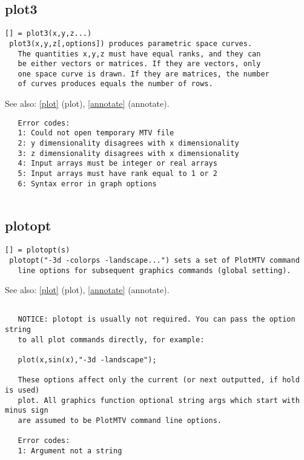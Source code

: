 \documentclass[a4paper]{article}
\begin{document}
\subsection{plot3\label{plot3}}

\begin{tscreen}
\begin{verbatim}
[] = plot3(x,y,z...)
 plot3(x,y,z[,options]) produces parametric space curves.
   The quantities x,y,z must have equal ranks, and they can
   be either vectors or matrices. If they are vectors, only
   one space curve is drawn. If they are matrices, the number
   of curves produces equals the number of rows.
\end{verbatim}

See also: \ref{plot} {(plot)}, \ref{annotate} {(annotate)}.
\begin{verbatim}
   Error codes:
   1: Could not open temporary MTV file
   2: y dimensionality disagrees with x dimensionality
   3: z dimensionality disagrees with x dimensionality
   4: Input arrays must be integer or real arrays
   5: Input arrays must have rank equal to 1 or 2
   6: Syntax error in graph options
   
\end{verbatim}
\end{tscreen}





\subsection{plotopt\label{plotopt}}

\begin{tscreen}
\begin{verbatim}
[] = plotopt(s)
 plotopt("-3d -colorps -landscape...") sets a set of PlotMTV command
   line options for subsequent graphics commands (global setting).
\end{verbatim}

See also: \ref{plot} {(plot)}, \ref{annotate} {(annotate)}.
\begin{verbatim}

   NOTICE: plotopt is usually not required. You can pass the option string
   to all plot commands directly, for example:

   plot(x,sin(x),"-3d -landscape");

   These options affect only the current (or next outputted, if hold is used)
   plot. All graphics function optional string args which start with minus sign
   are assumed to be PlotMTV command line options.
   
   Error codes:
   1: Argument not a string 
\end{verbatim}
\end{tscreen}
\end{document}
